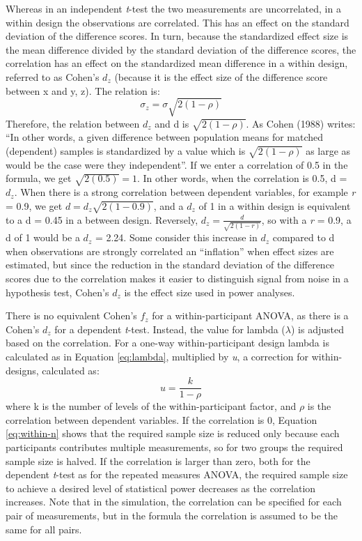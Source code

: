 \documentclass[,jou, draftfirst, a4paper,floatsintext]{apa6}
\begin{document}
Whereas in an independent \emph{t}-test the two measurements are uncorrelated, in a within design the observations are correlated.
This has an effect on the standard deviation of the difference scores.
In turn, because the standardized effect size is the mean difference divided by the standard deviation of the difference scores, the correlation has an effect on the standardized mean difference in a within design, referred to as Cohen's \(d_z\) (because it is the effect size of the difference score between x and y, z). The relation is:
\begin{equation}
\sigma_{z}=\sigma\sqrt{2(1-\rho)}
\end{equation}
Therefore, the relation between \(d_z\) and d is \(\sqrt{2(1-\rho)}\).
As Cohen (1988) writes: \enquote{In other words, a given difference between population means for matched (dependent) samples is standardized by a value which is \(\sqrt{2(1-\rho)}\) as large as would be the case were they independent}.
If we enter a correlation of 0.5 in the formula, we get \(\sqrt{2(0.5)}=1\).
In other words, when the correlation is 0.5, d = \(d_z\). When there is a strong correlation between dependent variables, for example \emph{r} = 0.9, we get \(d=d_{z}\sqrt{2(1-0.9)}\), and a \(d_z\) of 1 in a within design is equivalent to a d = 0.45 in a between design.
Reversely, \(d_{z}=\frac{d}{\sqrt{2(1-r)}}\), so with a \emph{r} = 0.9, a d of 1 would be a \(d_z\) = 2.24.
Some consider this increase in \(d_z\) compared to d when observations are strongly correlated an \enquote{inflation} when effect sizes are estimated, but since the reduction in the standard deviation of the difference scores due to the correlation makes it easier to distinguish signal from noise in a hypothesis test, Cohen's \(d_z\) is the effect size used in power analyses.

There is no equivalent Cohen's \(f_z\) for a within-participant ANOVA, as there is a Cohen's \(d_z\) for a dependent \emph{t}-test. Instead, the value for lambda (\(\lambda\)) is adjusted based on the correlation. For a one-way within-participant design lambda is calculated as in Equation \eqref{eq:lambda}, multiplied by \emph{u}, a correction for within-designs, calculated as:
\begin{equation}
u = \frac{k}{1-\rho}
\end{equation}
where k is the number of levels of the within-participant factor, and \(\rho\) is the correlation between dependent variables.
If the correlation is 0, Equation \eqref{eq:within-n} shows that the required sample size is reduced only because each participants contributes multiple measurements, so for two groups the required sample size is halved.
If the correlation is larger than zero, both for the dependent \emph{t}-test as for the repeated measures ANOVA, the required sample size to achieve a desired level of statistical power decreases as the correlation increases.
Note that in the simulation, the correlation can be specified for each pair of measurements, but in the formula the correlation is assumed to be the same for all pairs.
\end{document}
